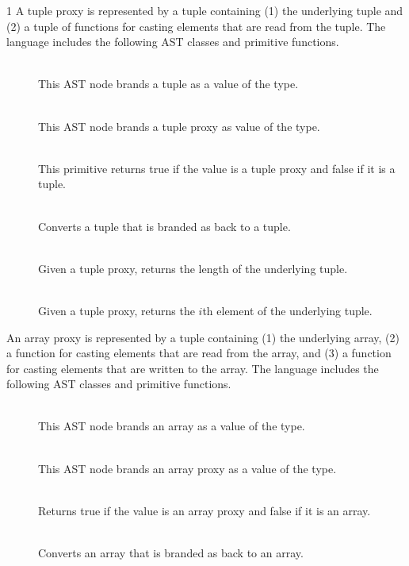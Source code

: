 \documentclass[7x10]{TimesAPriori_MIT}%
\def\pythonEd{1}
\def\edition{1}
\newcommand{\pythonColor}[0]{}
\numberwithin{theorem}{chapter}
\numberwithin{definition}{chapter}
\numberwithin{equation}{chapter}
\begin{document}
{\if\edition\pythonEd\pythonColor
%
A tuple proxy is represented by a tuple containing (1) the underlying
tuple and (2) a tuple of functions for casting elements that are read
from the tuple. The \LangPVec{} language includes the following AST
classes and primitive functions.

\begin{description}
\item[] \ \\
%
  This AST node brands a tuple as a value of the \PTUPLETYNAME{} type.
\item[]\ \\
%
  This AST node brands a tuple proxy as value of the \PTUPLETYNAME{} type.
\item[]\ \\
%
  This primitive returns true if the value is a tuple proxy and false
  if it is a tuple.
\item[]\ \\
%
  Converts a tuple that is branded as \PTUPLETYNAME{}
  back to a tuple.
  
\item[]\ \\
%
  Given a tuple proxy, returns the length of the underlying tuple.
  
\item[]\ \\
%
  Given a tuple proxy, returns the $i$th element of the underlying
  tuple.
  
\end{description}

An array proxy is represented by a tuple containing (1) the underlying
array, (2) a function for casting elements that are read from the
array, and (3) a function for casting elements that are written to the
array.  The \LangPVec{} language includes the following AST classes
and primitive functions.

\begin{description}
\item[]\ \\
  This AST node brands an array as a value of the \PARRAYTYNAME{} type.

\item[]\ \\
%
  This AST node brands an array proxy as a value of the \PARRAYTYNAME{} type.
\item[]\ \\
%
  Returns true if the value is an array proxy and false if it is an
  array.
\item[]\ \\
%
  Converts an array that is branded as \PARRAYTYNAME{} back to an
  array.
  

\end{description}}
\end{document}
